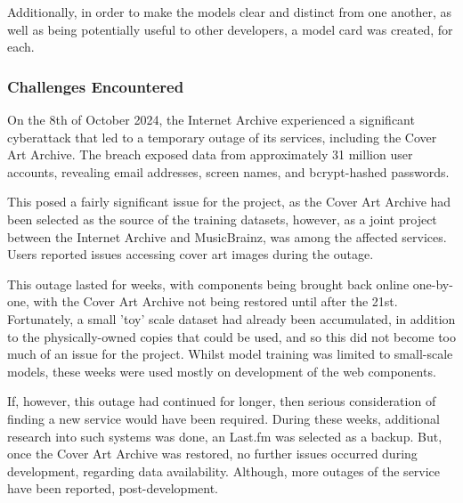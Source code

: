                 Additionally, in order to make the models clear and distinct from one another, as well as being potentially useful to other developers, a model card \cite{Mitchell_2019} was created, for each.
            
            \subsubsection{Challenges Encountered}
    
                On the 8th of October 2024, the Internet Archive experienced a significant cyberattack that led to a temporary outage of its services, including the Cover Art Archive. The breach exposed data from approximately 31 million user accounts, revealing email addresses, screen names, and bcrypt-hashed passwords. %
    
                This posed a fairly significant issue for the project, as the Cover Art Archive had been selected as the source of the training datasets, however, as a joint project between the Internet Archive and MusicBrainz, was among the affected services. Users reported issues accessing cover art images during the outage. %
    
                This outage lasted for weeks, with components being brought back online one-by-one,
                with the Cover Art Archive not being restored until after the 21st. Fortunately, a small 'toy' scale dataset had already been accumulated, in addition to the physically-owned copies that could be used, and so this did not become too much of an issue for the project. Whilst model training was limited to small-scale models, these weeks were used mostly on development of the web components.
    
                If, however, this outage had continued for longer, then serious consideration of finding a new service would have been required. During these weeks, additional research into such systems was done, an Last.fm was selected as a backup. But, once the Cover Art Archive was restored, no further issues occurred during development, regarding data availability. Although, more outages of the service have been reported, post-development. %
    
